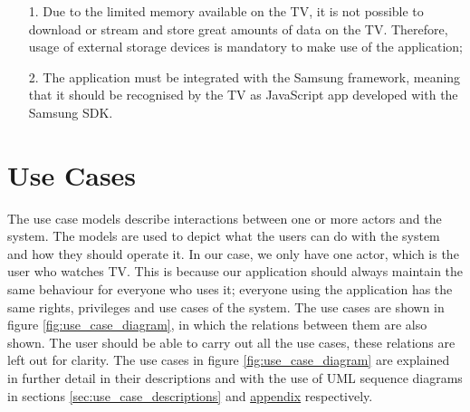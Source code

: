\begin{itemize}
\item[1.] Due to the limited memory available on the TV, it is not
possible to download or stream and store great amounts of data on the TV.
Therefore, usage of external storage devices is mandatory to make use
of the application;

\item[2.] The application must be integrated with the Samsung
framework, meaning that it should be recognised by the TV as
JavaScript app developed with the Samsung SDK.
\end{itemize}

\section{Use Cases}
\label{sec:use_cases}
The use case models describe interactions between one or more actors and the system.
The models are used to depict what the users can do with the system and how they  should operate it.
In our case, we only have one actor, which is the user who watches TV. This is because our application should always
maintain the same behaviour for everyone who uses it; everyone using the application has the same rights, privileges
and use cases of the system. The use cases are shown in figure \ref{fig:use_case_diagram},
in which the relations between them are also shown. The user should be able to carry out all the use cases,
these relations are left out for clarity. The use cases in figure \ref{fig:use_case_diagram}
are explained in further detail in their descriptions and with the use of UML sequence diagrams in sections
\hyperref[sec:use_case_descriptions]{\ref*{sec:use_case_descriptions}} and
\hyperref[sec:req_dynamic_models]{appendix} respectively.

